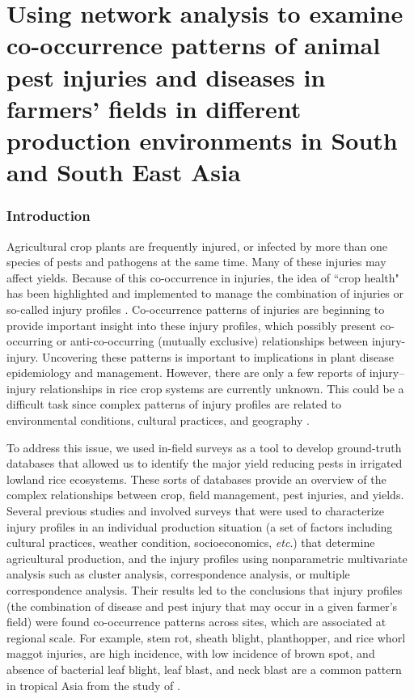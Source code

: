\chapter{Using network analysis to examine co-occurrence patterns of animal pest injuries and diseases in farmers' fields in different production environments in South and South East Asia}

\subsection{Introduction}

Agricultural crop plants are frequently injured, or infected by more than one species of pests and pathogens at the same time. Many of these injuries may affect yields. Because of this co-occurrence in injuries, the idea of ``crop health" has been highlighted and implemented to manage the combination of injuries or so-called injury profiles \citep{Savary_2006_Quantification}. Co-occurrence patterns of injuries are beginning to provide important insight into these injury profiles, which possibly present co-occurring or anti-co-occurring (mutually exclusive) relationships between injury-injury. Uncovering these patterns is important to implications in plant disease epidemiology and management. However, there are only a few reports of injury–injury relationships in rice crop systems are currently unknown. This could be a difficult task since complex patterns of injury profiles are related to environmental conditions, cultural practices, and geography \citep{Willocquet_2008_Simulating}.

To address this issue, we used in-field surveys as a tool to develop ground-truth databases that allowed us to identify the major yield reducing pests in irrigated lowland rice ecosystems. These sorts of databases provide an overview of the complex relationships between crop, field management, pest injuries, and yields. Several previous studies \citet{Savary_2000_Quantification, Savary_2000_Characterization, Dong_2010_Characterization} and \citet{Reddy_2011_Characterizing} involved surveys that were used to characterize injury profiles in an individual production situation (a set of factors including cultural practices, weather condition, socioeconomics, \textit{etc}.) that determine agricultural production, and the injury profiles using nonparametric multivariate analysis such as cluster analysis, correspondence analysis, or multiple correspondence analysis. Their results led to the conclusions that injury profiles (the combination of disease and pest injury that may occur in a given farmer’s field) were found co-occurrence patterns across sites, which are associated at regional scale. For example, stem rot, sheath blight, planthopper, and rice whorl maggot injuries, are high incidence, with low incidence of brown spot, and absence of bacterial leaf blight, leaf blast, and neck blast are a common pattern in tropical Asia from the study of \citet{Savary_2000_Characterization}.


